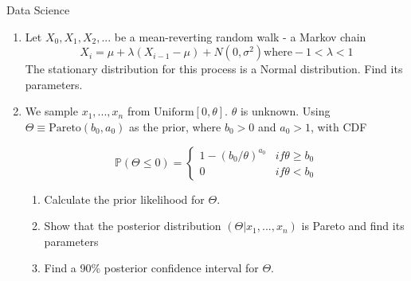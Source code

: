 \documentclass{tripos}
\begin{document}
\begin{question}[MockIB,year=2025,paper=2,question=2,author=rrw]{Data Science}

  \begin{enumerate}
  \item Let $X_0, X_1, X_2, ...$ be a mean-reverting random walk - a Markov chain
    \[
    X_i = \mu + \lambda{}(X_{i-1}-\mu) + N(0,\sigma^2) \mbox{where} -1 < \lambda < 1
    \]
The stationary distribution for this process is a Normal distribution. Find its parameters.

\item We sample $x_1,...,x_n$ from $\mbox{Uniform}[0,\theta]$. $\theta$ is unknown. Using
  $\Theta \equiv \mbox{Pareto}(b_0, a_0)$ as the prior, where $b_0 > 0$ and $a_0 > 1$, with
  CDF

  \[
  \mathbb{P}(\Theta \le 0) = \begin{cases}
    1-{(b_0/\theta{})}^{a_0} & if \theta \ge b_0 \\
    0 & if \theta < b_0
  \end{cases}
  \]

  \begin{enumerate}
  \item Calculate the prior likelihood for $\Theta$. 
  \item Show that the posterior distribution $(\Theta | x_1,...,x_n)$ is Pareto and find its parameters 
  \item Find a 90\% posterior confidence interval for $\Theta{}$. 
  \end{enumerate}
\end{enumerate}
  \end{question}
  \eject
\end{document}
